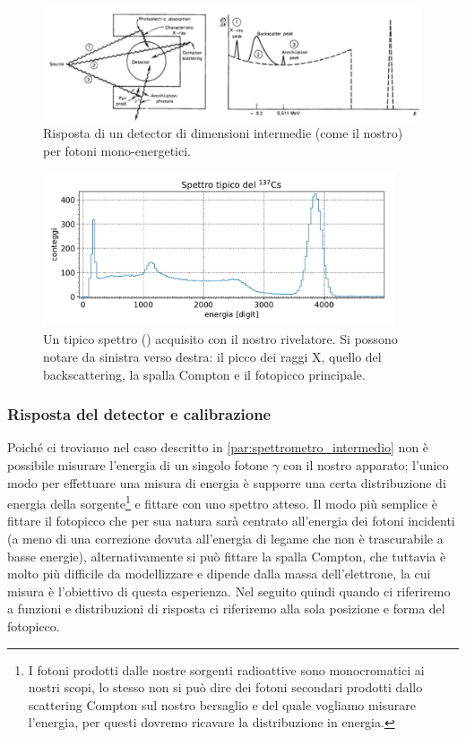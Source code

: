  \begin{figure}[h]
	\centering
	\includegraphics[width=35em]{spettrometro_intermedio}
	\caption{\label{fig:spettrometro_intermedio}Risposta di un detector di dimensioni intermedie (come il nostro) per fotoni mono-energetici.}
 \end{figure}

 \begin{figure}[h]
	\centering
	\includegraphics[width=28em]{spettro_tipico}
	\caption{\label{fig:spettro_tipico}Un tipico spettro (\cs) acquisito con il nostro rivelatore. Si possono notare da sinistra verso destra: il picco dei raggi X, quello del backscattering, la spalla Compton e il fotopicco principale.}
\end{figure}


 \subsubsection{Risposta del detector e calibrazione}
 Poiché ci troviamo nel caso descritto in \autoref{par:spettrometro_intermedio} non è possibile misurare l'energia di un singolo fotone $\gamma$ con il nostro apparato; l'unico modo per effettuare una misura di energia è supporre una certa distribuzione di energia della sorgente\footnote{I fotoni prodotti dalle nostre sorgenti radioattive sono monocromatici ai nostri scopi, lo stesso non si può dire dei fotoni secondari prodotti dallo scattering Compton sul nostro bersaglio e del quale vogliamo misurare l'energia, per questi dovremo ricavare la distribuzione in energia.} e fittare con uno spettro atteso.
 Il modo più semplice è fittare il fotopicco che per sua natura sarà centrato all'energia dei fotoni incidenti (a meno di una correzione dovuta all'energia di legame che non è trascurabile a basse energie), alternativamente si può fittare la spalla Compton, che tuttavia è molto più difficile da modellizzare e dipende dalla massa dell'elettrone, la cui misura è l'obiettivo di questa esperienza. Nel seguito quindi quando ci riferiremo a funzioni e distribuzioni di risposta ci riferiremo alla sola posizione e forma del fotopicco.

